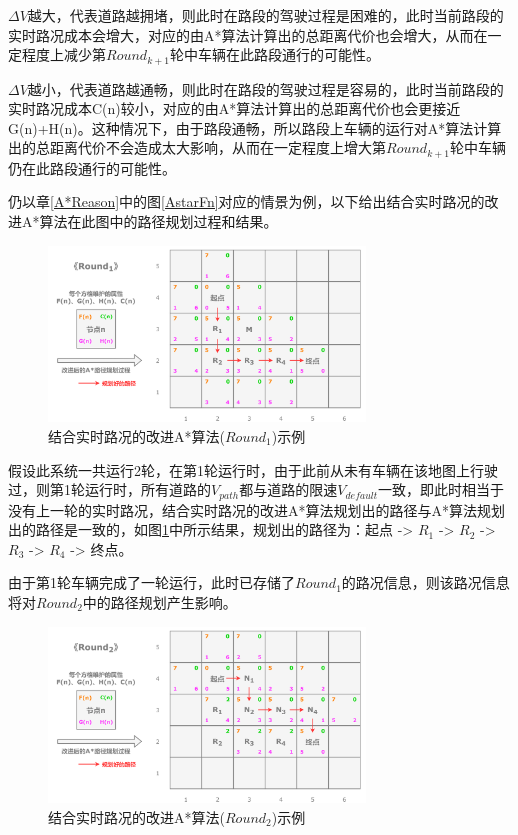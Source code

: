 $\Delta V$越大，代表道路越拥堵，则此时在路段的驾驶过程是困难的，此时当前路段的实时路况成本会增大，对应的由A*算法计算出的总距离代价也会增大，从而在一定程度上减少第$Round_{k+1}$轮中车辆在此路段通行的可能性。

$\Delta V$越小，代表道路越通畅，则此时在路段的驾驶过程是容易的，此时当前路段的实时路况成本C(n)较小，对应的由A*算法计算出的总距离代价也会更接近G(n)+H(n)。这种情况下，由于路段通畅，所以路段上车辆的运行对A*算法计算出的总距离代价不会造成太大影响，从而在一定程度上增大第$Round_{k+1}$轮中车辆仍在此路段通行的可能性。

仍以章\ref{A*Reason}中的图\ref{AstarFn}对应的情景为例，以下给出结合实时路况的改进A*算法在此图中的路径规划过程和结果。

\begin{figure}[ht]
  \centering
  \includegraphics[width=0.75\textwidth]{undergraduate-thesis/images/Astar_newFnRound1.png}
  \caption{结合实时路况的改进A*算法($Round_1$)示例}
  \label{AstarnewFnR1} %
\end{figure}

假设此系统一共运行2轮，在第1轮运行时，由于此前从未有车辆在该地图上行驶过，则第1轮运行时，所有道路的$V_{path}$都与道路的限速$V_{default}$一致，即此时相当于没有上一轮的实时路况，结合实时路况的改进A*算法规划出的路径与A*算法规划出的路径是一致的，如图\ref{AstarnewFnR1}中所示结果，规划出的路径为：起点 -> $R_1$ -> $R_2$ -> $R_3$ -> $R_4$ -> 终点。

由于第1轮车辆完成了一轮运行，此时已存储了$Round_1$的路况信息，则该路况信息将对$Round_2$中的路径规划产生影响。

\begin{figure}[ht]
  \centering
  \includegraphics[width=0.75\textwidth]{undergraduate-thesis/images/Astar_newFnRound2.png}
  \caption{结合实时路况的改进A*算法($Round_2$)示例}
  \label{AstarnewFnR2} %
\end{figure}

